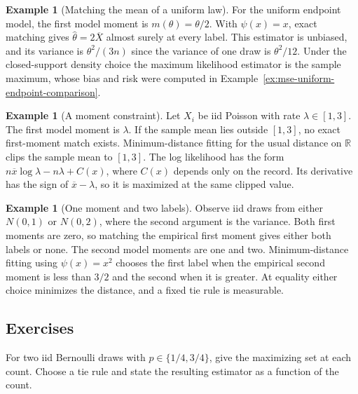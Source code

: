\documentclass[11pt,oneside]{book}
\theoremstyle{definition}
\newtheorem{example}[theorem]{Example}
\theoremstyle{remark}
\newcommand{\R}{\mathbb R}
\begin{document}
\begin{example}[Matching the mean of a uniform law]
\label{ex:mom-uniform-endpoint}
For the uniform endpoint model, the first model moment is
$m(\theta)=\theta/2$. With $\psi(x)=x$, exact matching gives
$\widehat\theta=2\overline X$ almost surely at every label.
This estimator is unbiased, and its variance is $\theta^2/(3n)$
since the variance of one draw is $\theta^2/12$. Under the
closed-support density choice the maximum likelihood estimator is
the sample maximum, whose bias and risk were computed in
Example~\ref{ex:mse-uniform-endpoint-comparison}.
\end{example}

\begin{example}[A moment constraint]
\label{ex:mom-poisson-compact}
Let $X_i$ be iid Poisson with rate $\lambda\in[1,3]$. The first
model moment is $\lambda$. If the sample mean lies outside $[1,3]$,
no exact first-moment match exists. Minimum-distance fitting for the
usual distance on $\R$ clips the sample mean to $[1,3]$.
The log likelihood has the form
$n\overline x\log\lambda-n\lambda+C(x)$, where $C(x)$ depends
only on the record. Its derivative has the sign of
$\overline x-\lambda$, so it is maximized at the same clipped value.
\end{example}

\begin{example}[One moment and two labels]
\label{ex:mom-normal-first-moment}
Observe iid draws from either $N(0,1)$ or $N(0,2)$, where the second
argument is the variance. Both first moments are zero, so matching
the empirical first moment gives either both labels or none.
The second model moments are one and two. Minimum-distance fitting
using $\psi(x)=x^2$ chooses the first label when the empirical second
moment is less than $3/2$ and the second when it is greater.
At equality either choice minimizes the distance, and a fixed
tie rule is measurable.
\end{example}

\subsection{Exercises}
\label{subsec:practice-5-2}

\begin{practiceexercise}
\label{pex:ml-bernoulli-finite-tie}
For two iid Bernoulli draws with $p\in\{1/4,3/4\}$, give the
maximizing set at each count. Choose a tie rule and state
the resulting estimator as a function of the count.
\end{practiceexercise}
\end{document}
